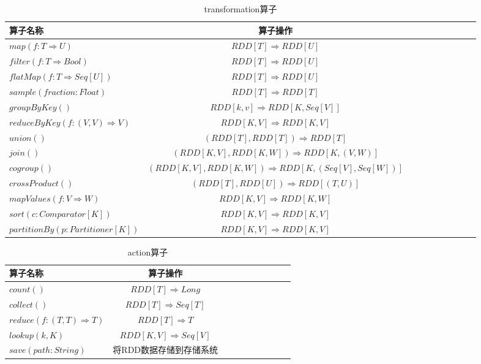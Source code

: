 \begin{table}
 \centering
 \small
 \caption{transformation算子}
 \label{tab:transformation}
 \begin{tabular}{lccccccccl}
  \toprule
  算子名称 & 算子操作 \\
  \midrule
  $map(f: T \Rightarrow  U)$ & $RDD[T] \Rightarrow RDD[U]$ \\
  $filter(f : T \Rightarrow Bool)$ & $ RDD[T] \Rightarrow RDD[U] $ \\
  $flatMap(f : T \Rightarrow Seq[U]) $ & $ RDD[T] \Rightarrow RDD[U] $ \\
  $sample(fraction : Float)$ & $RDD[T] \Rightarrow RDD[T]$ \\
  $groupByKey()$ & $RDD[k, v] \Rightarrow RDD[K, Seq[V]]$ \\
  $reduceByKey(f : (V, V) \Rightarrow V)$ & $RDD[K,V] \Rightarrow RDD[K,V]$ \\
  $union()$ & $(RDD[T], RDD[T]) \Rightarrow RDD[T]$ \\
  $join()$ & $(RDD[K,V], RDD[K,W]) \Rightarrow RDD[K, (V, W)]$ \\
  $cogroup()$ & $(RDD[K,V], RDD[K,W]) \Rightarrow RDD[K, (Seq[V], Seq[W])]$ \\
  $crossProduct()$ & $(RDD[T], RDD[U]) \Rightarrow RDD[(T,U)]$ \\
  $mapValues(f : V \Rightarrow W)$ & $RDD[K,V] \Rightarrow RDD[K,W]$ \\
  $sort(c:Comparator[K])$ & $RDD[K,V] \Rightarrow RDD[K,V]$ \\
  $partitionBy(p : Partitioner[K])$ & $RDD[K,V] \Rightarrow RDD[K,V]$ \\
  \bottomrule
 \end{tabular}
\end{table}

\begin{table}
 \centering
 \small
 \caption{action算子}
 \label{tab:action}
 \begin{tabular}{lccccccccl}
  \toprule
  算子名称 & 算子操作 \\
  \midrule
  $count()$ & $RDD[T] \Rightarrow Long$\\
  $collect()$ & $RDD[T] \Rightarrow Seq[T]$\\
  $reduce(f : (T,T) \Rightarrow T)$ & $RDD[T] \Rightarrow T$\\
  $lookup(k, K)$ & $RDD[K,V] \Rightarrow Seq[V]$\\
  $save(path:String)$ & 将RDD数据存储到存储系统\\
  \bottomrule
 \end{tabular}
\end{table}


